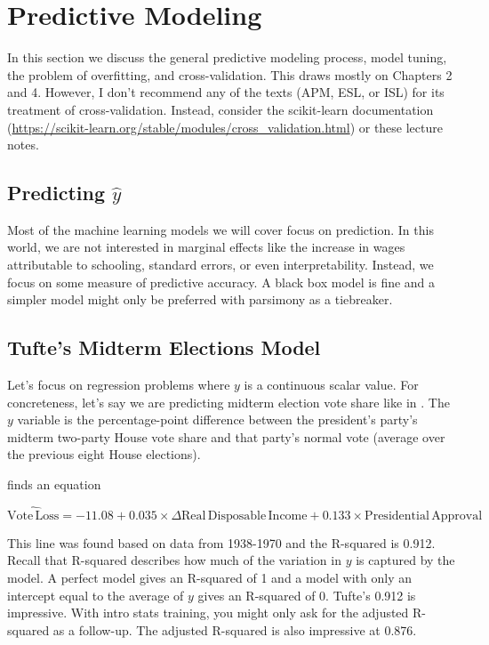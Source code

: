 \section{Predictive Modeling}

In this section we discuss the general predictive modeling process, model tuning, the problem of overfitting, and cross-validation. This draws mostly on \cite{kuhn2013applied} Chapters 2 and 4. However, I don't recommend any of the texts (APM, ESL, or ISL) for its treatment of cross-validation. Instead, consider the scikit-learn documentation (\url{https://scikit-learn.org/stable/modules/cross_validation.html}) or these lecture notes.

\subsection{Predicting $\hat{y}$}

Most of the machine learning models we will cover focus on prediction. In this world, we are not interested in marginal effects like the increase in wages attributable to schooling, standard errors, or even interpretability. Instead, we focus on some measure of predictive accuracy. A black box model is fine and a simpler model might only be preferred with parsimony as a tiebreaker.

\subsection{Tufte's Midterm Elections Model}

Let's focus on regression problems where $y$ is a continuous scalar value. For concreteness, let's say we are predicting midterm election vote share like in \cite{tufte1975determinants}. The $y$ variable is the percentage-point difference between the president's party's midterm two-party House vote share and that party's normal vote (average over the previous eight House elections).

\cite{tufte1975determinants} finds an equation 

\begin{equation}
\widehat{\mathrm{Vote\,Loss}} = -11.08 + 0.035\times \Delta\mathrm{Real\,Disposable\,Income} + 0.133\times \mathrm{Presidential\,Approval}
\label{eq:tufte-model}
\end{equation}

This line was found based on data from 1938-1970 and the R-squared is 0.912. Recall that R-squared describes how much of the variation in $y$ is captured by the model. A perfect model gives an R-squared of 1 and a model with only an intercept equal to the average of $y$ gives an R-squared of 0. Tufte's 0.912 is impressive. With intro stats training, you might only ask for the adjusted R-squared as a follow-up. The adjusted R-squared is also impressive at 0.876.

